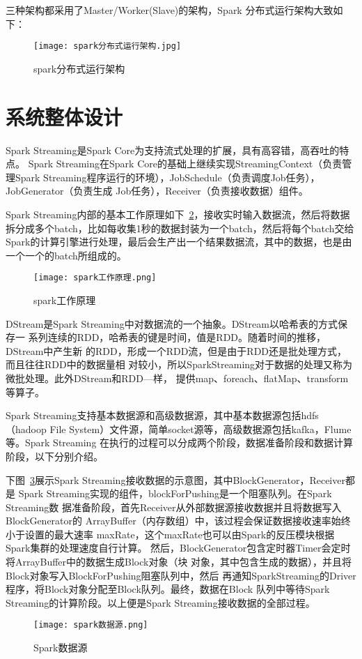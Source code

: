 三种架构都采用了Master/Worker(Slave)的架构，Spark 分布式运行架构大致如下：
\begin{figure}
    \centering
    \texttt{[image: spark分布式运行架构.jpg]}
    \caption{spark分布式运行架构}
    \label{fig:spark}
  \end{figure}

\section{系统整体设计}
Spark Streaming是Spark Core为支持流式处理的扩展，具有高容错，高吞吐的特点。
Spark Streaming在Spark Core的基础上继续实现StreamingContext（负责管理Spark Streaming程序运行的环境），JobSchedule（负责调度Job任务），JobGenerator（负责生成
Job任务），Receiver（负责接收数据）组件。

Spark Streaming内部的基本工作原理如下~\ref{fig:spark工作原理}，接收实时输入数据流，然后将数据拆分成多个batch，比如每收集1秒的数据封装为一个batch，然后将每个batch交给Spark的计算引擎进行处理，最后会生产出一个结果数据流，其中的数据，也是由一个一个的batch所组成的。

\begin{figure}
    \centering
    \texttt{[image: spark工作原理.png]}
    \caption{spark工作原理}
    \label{fig:spark工作原理}
  \end{figure}

DStream是Spark Streaming中对数据流的一个抽象。DStream以哈希表的方式保存一
系列连续的RDD，哈希表的键是时间，值是RDD。随着时间的推移，DStream中产生新
的RDD，形成一个RDD流，但是由于RDD还是批处理方式，而且往往RDD中的数据量相
对较小，所以SparkStreaming对于数据的处理又称为微批处理。此外DStream和RDD—样，
提供map、foreach、flatMap、transform等算子。

Spark Streaming支持基本数据源和高级数据源，其中基本数据源包括hdfs（hadoop File System）文件源，简单socket源等，高级数据源包括kafka，Flume等。Spark Streaming
在执行的过程可以分成两个阶段，数据准备阶段和数据计算阶段，以下分别介绍。

下图~\ref{fig:spark}展示Spark Streaming接收数据的示意图，其中BlockGenerator，Receiver都是
Spark Streaming实现的组件，blockForPushing是一个阻塞队列。在Spark Streaming数
据准备阶段，首先Receiver从外部数据源接收数据并且将数据写入BlockGenerator的
ArrayBuffer（内存数组）中，该过程会保证数据接收速率始终小于设置的最大速率
maxRate，这个maxRate也可以由Spark的反压模块根据Spark集群的处理速度自行计算。
然后，BlockGenerator包含定时器Timer会定时将ArrayBuffer中的数据生成Block对象（块
对象，其中包含生成的数据），并且将Block对象写入BlockForPushing阻塞队列中，然后
再通知SparkStreaming的Driver程序，将Block对象分配至Block队列。最终，数据在Block
队列中等待Spark Streaming的计算阶段。以上便是Spark Streaming接收数据的全部过程。
\begin{figure}
    \centering
    \texttt{[image: spark数据源.png]}
    \caption{Spark数据源}
    \label{fig:spark}
  \end{figure}

